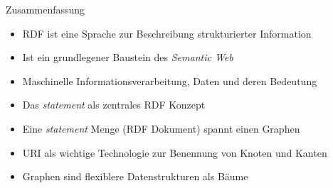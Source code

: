 \documentclass{beamer}
\begin{document}
\begin{frame}{Zusammenfassung}
	
	\begin{itemize}
		\item RDF ist eine Sprache zur Beschreibung strukturierter Information
		\item Ist ein grundlegener Baustein des \emph{Semantic Web}
		\item Maschinelle Informationsverarbeitung, Daten und deren Bedeutung
		\item Das \emph{statement} als zentrales RDF Konzept
		\item Eine \emph{statement} Menge (RDF Dokument) spannt einen Graphen
		\item URI als wichtige Technologie zur Benennung von Knoten und Kanten
		\item Graphen sind flexiblere Datenstrukturen als Bäume
	\end{itemize}
	
\end{frame}
\end{document}
